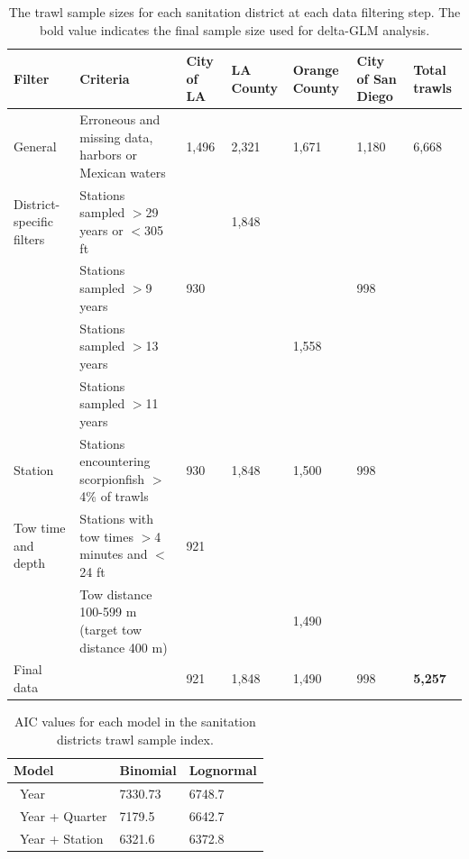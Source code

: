 \documentclass[12pt,]{article}
\begin{document}
\begin{table}[ht]
\centering
\caption{The trawl sample sizes for each
                                          sanitation district at each data filtering step.  
                                          The bold value indicates the final sample size 
                                          used for delta-GLM analysis.} 
\label{tab:Fleet7_Sanitation_filter}
\begin{tabular}{>{\raggedright}p{.8in}>{\raggedright}p{2in}>{\raggedright}p{.6in}>{\raggedright}p{.6in}>{\raggedright}p{.6in}>{\raggedright}p{.8in}>{\raggedright}p{.6in}}
  \hline
Filter & Criteria & City of LA & LA County & Orange County & City of San Diego & Total trawls \\ 
  \hline
General & Erroneous and missing data, harbors or Mexican waters & 1,496 & 2,321 & 1,671 & 1,180 & 6,668 \\ 
  District-specific filters & Stations sampled $>$29 years or $<$305 ft &  & 1,848 &  &  &  \\ 
   & Stations sampled $>$9 years & 930 &  &  & 998 &  \\ 
   & Stations sampled $>$13 years &  &  & 1,558 &  &  \\ 
   & Stations sampled $>$11 years &  &  &  &  &  \\ 
  Station & Stations encountering scorpionfish $>$4\% of trawls & 930 & 1,848 & 1,500 & 998 &  \\ 
  Tow time and depth & Stations with tow times $>$4 minutes and $<$24 ft & 921 &  &  &  &  \\ 
   & Tow distance 100-599 m (target tow distance 400 m) &  &  & 1,490 &  &  \\ 
  Final data &  & 921 & 1,848 & 1,490 & 998 & \textbf{5,257} \\ 
   \hline
\end{tabular}
\end{table}\begin{table}[ht]
\centering
\caption{AIC values for each model in the
                                         sanitation districts trawl sample 
                                          index.} 
\label{tab:Fleet7_Sanitation_aic}
\begin{tabular}{lll}
  \hline
Model & Binomial & Lognormal \\ 
  \hline
~Year & 7330.73 & 6748.7 \\ 
  ~Year + Quarter & 7179.5 & 6642.7 \\ 
  ~Year + Station & 6321.6 & 6372.8 \\ 

\end{tabular}
\end{table}
\end{document}
